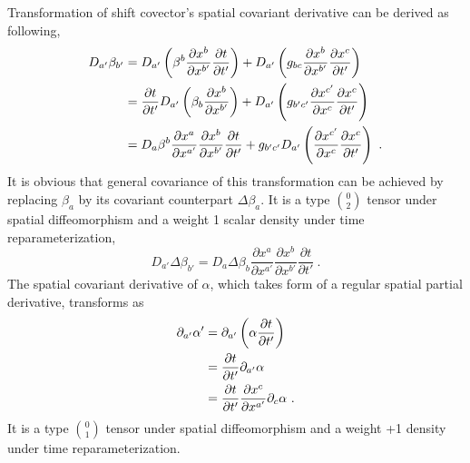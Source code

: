 Transformation of shift covector's spatial covariant derivative can be derived as following, 
\begin{align}\label{shiftvectorcovariantspatialderivativetransform}
D_{a'}\beta_{b'} &= D_{a'}\left(\beta^{b}\frac{\partial x^{b}}{\partial x^{b'}}\frac{\partial t}{\partial t'}\right) + D_{a'}\left(g_{bc}\frac{\partial x^{b}}{\partial x^{b'}}\frac{\partial x^{c}}{\partial t'}\right)\notag\\
& = \frac{\partial t}{\partial t'}D_{a'}\left(\beta_{b}\frac{\partial x^{b}}{\partial x^{b'}}\right) + D_{a'}\left(g_{b'c'}\frac{\partial x^{c'}}{\partial x^{c}}\frac{\partial x^{c}}{\partial t'}\right)\notag\\
& = D_{a}\beta^{b}\frac{\partial x^{a}}{\partial x^{a'}}\frac{\partial x^{b}}{\partial x^{b'}}\frac{\partial t}{\partial t'} + g_{b'c'}D_{a'}\left(\frac{\partial x^{c'}}{\partial x^{c}}\frac{\partial x^{c}}{\partial t'}\right) \ .
\end{align} 
It is obvious that general covariance of this transformation can be achieved by replacing $\beta_{a}$ by its covariant counterpart $\Delta \beta_{a}$. It is a type $0 \choose 2$ tensor under spatial diffeomorphism and a weight 1 scalar density under time reparameterization, 
\begin{equation}\label{covariantshiftvectorcovariantspatialderivativetransform}
	D_{a'}\Delta\beta_{b'} = D_{a}\Delta\beta_{b}\frac{\partial x^{a}}{\partial x^{a'}}\frac{\partial x^{b}}{\partial x^{b'}}\frac{\partial t}{\partial t'} \ .
\end{equation}	
The spatial covariant derivative of $\alpha$, which takes form of a regular spatial partial derivative, transforms as 
\begin{align}\label{lapsefunctionspatialderivative}
\partial_{a'}\alpha' & = \partial_{a'}\left(\alpha \frac{\partial t}{\partial t'}\right) \notag \\
& = \frac{\partial t}{\partial t'}\partial_{a'}\alpha \notag \\
& = \frac{\partial t}{\partial t'}\frac{\partial x^{c}}{\partial x^{a'}}\partial_{c}\alpha \ .
\end{align}
It is a type $0 \choose 1$ tensor under spatial diffeomorphism and a weight +1 density under time reparameterization.

